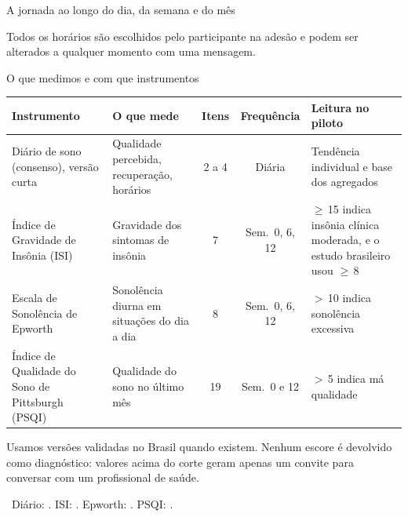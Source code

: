 \documentclass[aspectratio=169,10pt]{beamer}
\newcommand{\fonte}[1]{\par\vfill{\tiny\color{mudo}\faBookOpen\ #1\par}}
\begin{document}
\begin{frame}{A jornada ao longo do dia, da semana e do mês}
\begin{adjustbox}{max width=\textwidth}
\end{adjustbox}
\vfill
\small Todos os horários são escolhidos pelo participante na adesão e podem
ser alterados a qualquer momento com uma mensagem.
\end{frame}

\begin{frame}{O que medimos e com que instrumentos}
\scriptsize
\begin{tabularx}{\textwidth}{@{}l L c c L@{}}
\toprule
\textbf{Instrumento} & \textbf{O que mede} & \textbf{Itens} & \textbf{Frequência} & \textbf{Leitura no piloto} \\
\midrule
Diário de sono (consenso), versão curta & Qualidade percebida, recuperação, horários & 2 a 4 & Diária & Tendência individual e base dos agregados \\
Índice de Gravidade de Insônia (ISI) & Gravidade dos sintomas de insônia & 7 & Sem.\ 0, 6, 12 & $\geq$\,15 indica insônia clínica moderada, e o estudo brasileiro usou $\geq$\,8 \\
Escala de Sonolência de Epworth & Sonolência diurna em situações do dia a dia & 8 & Sem.\ 0, 6, 12 & $>$\,10 indica sonolência excessiva \\
Índice de Qualidade do Sono de Pittsburgh (PSQI) & Qualidade do sono no último mês & 19 & Sem.\ 0 e 12 & $>$\,5 indica má qualidade \\
\bottomrule
\end{tabularx}
\medskip

\small Usamos versões validadas no Brasil quando existem. Nenhum escore é
devolvido como diagnóstico: valores acima do corte geram apenas um
convite para conversar com um profissional de saúde.
\fonte{Diário: \textcite{carney2012}. ISI: \textcite{bastien2001,castro2011}.
  Epworth: \textcite{johns1991,bertolazi2009}. PSQI: \textcite{buysse1989,bertolazi2011}.}
\end{frame}
\end{document}
